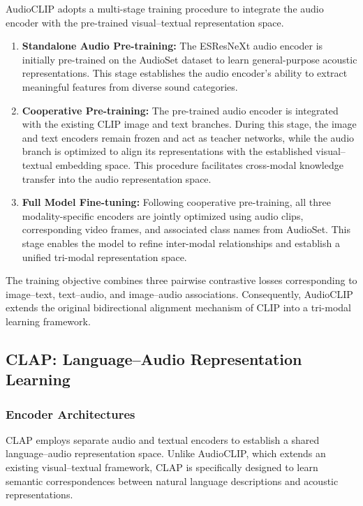 \documentclass[pdflatex,sn-mathphys-num]{sn-jnl}%
\theoremstyle{thmstyleone}%
\theoremstyle{thmstyletwo}%
\theoremstyle{thmstylethree}%
\begin{document}
AudioCLIP adopts a multi-stage training procedure to integrate the audio encoder with the pre-trained visual--textual representation space.

\begin{enumerate}
    \item \textbf{Standalone Audio Pre-training:}
    The ESResNeXt audio encoder is initially pre-trained on the AudioSet dataset to learn general-purpose acoustic representations. This stage establishes the audio encoder's ability to extract meaningful features from diverse sound categories.

    \item \textbf{Cooperative Pre-training:}
    The pre-trained audio encoder is integrated with the existing CLIP image and text branches. During this stage, the image and text encoders remain frozen and act as teacher networks, while the audio branch is optimized to align its representations with the established visual--textual embedding space. This procedure facilitates cross-modal knowledge transfer into the audio representation space.

    \item \textbf{Full Model Fine-tuning:}
    Following cooperative pre-training, all three modality-specific encoders are jointly optimized using audio clips, corresponding video frames, and associated class names from AudioSet. This stage enables the model to refine inter-modal relationships and establish a unified tri-modal representation space.
\end{enumerate}

The training objective combines three pairwise contrastive losses corresponding to image--text, text--audio, and image--audio associations. Consequently, AudioCLIP extends the original bidirectional alignment mechanism of CLIP into a tri-modal learning framework.

\subsection{CLAP: Language--Audio Representation Learning}

\subsubsection{Encoder Architectures}

CLAP employs separate audio and textual encoders to establish a shared language--audio representation space. Unlike AudioCLIP, which extends an existing visual--textual framework, CLAP is specifically designed to learn semantic correspondences between natural language descriptions and acoustic representations.
\end{document}
